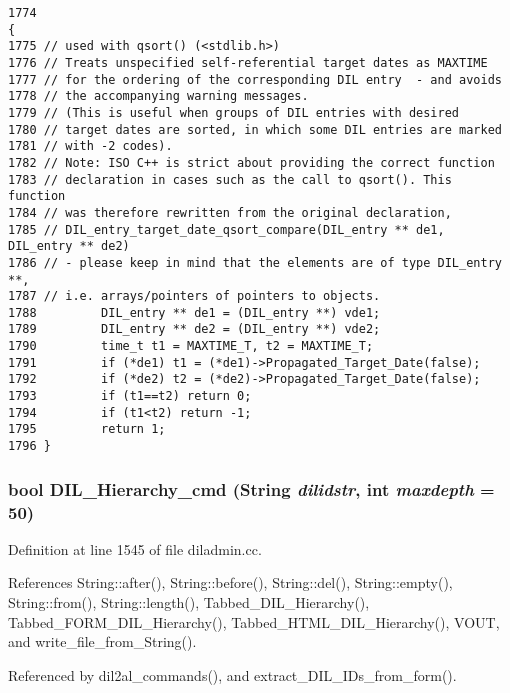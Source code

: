 \footnotesize\begin{verbatim}1774                                                                               {
1775 // used with qsort() (<stdlib.h>)
1776 // Treats unspecified self-referential target dates as MAXTIME
1777 // for the ordering of the corresponding DIL entry  - and avoids
1778 // the accompanying warning messages.
1779 // (This is useful when groups of DIL entries with desired
1780 // target dates are sorted, in which some DIL entries are marked
1781 // with -2 codes).
1782 // Note: ISO C++ is strict about providing the correct function
1783 // declaration in cases such as the call to qsort(). This function
1784 // was therefore rewritten from the original declaration,
1785 // DIL_entry_target_date_qsort_compare(DIL_entry ** de1, DIL_entry ** de2)
1786 // - please keep in mind that the elements are of type DIL_entry **,
1787 // i.e. arrays/pointers of pointers to objects.
1788         DIL_entry ** de1 = (DIL_entry **) vde1;
1789         DIL_entry ** de2 = (DIL_entry **) vde2;
1790         time_t t1 = MAXTIME_T, t2 = MAXTIME_T;
1791         if (*de1) t1 = (*de1)->Propagated_Target_Date(false);
1792         if (*de2) t2 = (*de2)->Propagated_Target_Date(false);
1793         if (t1==t2) return 0;
1794         if (t1<t2) return -1;
1795         return 1;
1796 }
\end{verbatim}\normalsize 
{}
\subsubsection{\setlength{\rightskip}{0pt plus 5cm}bool DIL\_\-Hierarchy\_\-cmd ({\bf String} {\em dilidstr}, int {\em maxdepth} = 50)}\label{dil2al_8hh_a315}




Definition at line 1545 of file diladmin.cc.

References String::after(), String::before(), String::del(), String::empty(), String::from(), String::length(), Tabbed\_\-DIL\_\-Hierarchy(), Tabbed\_\-FORM\_\-DIL\_\-Hierarchy(), Tabbed\_\-HTML\_\-DIL\_\-Hierarchy(), VOUT, and write\_\-file\_\-from\_\-String().

Referenced by dil2al\_\-commands(), and extract\_\-DIL\_\-IDs\_\-from\_\-form().



